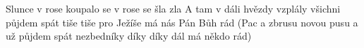 \begin{TEXT}{Slunce v rose koupalo se}
\SLOKA {} v rose  se  šla \NL
{}     zla   
\SLOKA A tam v dáli hvězdy vzplály všichni půjdem spát \NL
tiše tiše pro Ježíše má nás Pán Bůh rád 
\SLOKA (Pac a zbrusu novou pusu a už půjdem spát \NL
nezbedníky díky díky dál má někdo rád) \NL
\end{TEXT}
